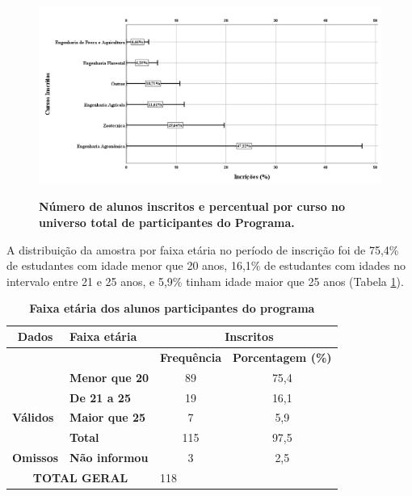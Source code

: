 \begin{figure}[H]
\caption{\textbf{Número de alunos inscritos e percentual por curso no universo total de participantes do Programa.}}
\centering
\includegraphics[scale=0.3]{Imagens/inscritos.png}
\label{figura_10}
\end{figure}

A distribuição da amostra por faixa etária no período de inscrição foi de 75,4\% de estudantes com idade menor que 20 anos, 16,1\% de estudantes com idades no intervalo entre 21 e 25 anos, e 5,9\% tinham idade maior que 25 anos (Tabela \ref{tabela_45}).


\begin{table}[H]
\centering
\caption{\textbf{Faixa etária dos alunos participantes do programa}}
\label{tabela_45}
\begin{tabular}{clcc} 
\hline\hline
 \textbf{Dados}                       & \textbf{Faixa etária}  & \multicolumn{2}{c}{~\textbf{Inscritos} }                                                        \\ 
\hline
\multirow{3}{*}{}                     &                        & \multicolumn{1}{l}{\textbf{Frequência} } & \multicolumn{1}{l}{\textbf{Porcentagem (\%)} }  \\
                                      & \textbf{Menor que 20}  & 89                                            & 75,4                                            \\
                                      & \textbf{De 21 a 25}    & 19                                            & 16,1                                            \\
\multicolumn{1}{l}{\textbf{Válidos} } & \textbf{Maior que 25}  & 7                                             & 5,9                                             \\
\multicolumn{1}{l}{}                  & \textbf{Total}         & 115                                           & 97,5                                            \\ 
\hline
\multicolumn{1}{l}{\textbf{Omissos} } & \textbf{Não informou}  & 3                                             & 2,5                                             \\ 
\hline
\multicolumn{2}{c}{\textbf{TOTAL GERAL} }                      & \multicolumn{1}{l}{118}                       &                                                 \\
\hline\hline
\end{tabular}
\end{table}


